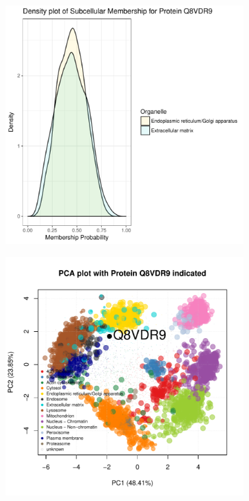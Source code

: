\documentclass[12pt,english]{article}
\begin{document}
\begin{figure}[h]
\begin{subfigure}[t]{0.5\textwidth}
    \caption{}
  \end{subfigure}
  \vspace{1cm}
  \begin{subfigure}[t]{0.5\textwidth}
    \centering
\includegraphics{tagm-025}
    \caption{}
  \end{subfigure}%
  \begin{subfigure}[t]{0.5\textwidth}
    \centering
\includegraphics{tagm-026}
    \caption{}
  \end{subfigure}


\end{figure}
\end{document}
